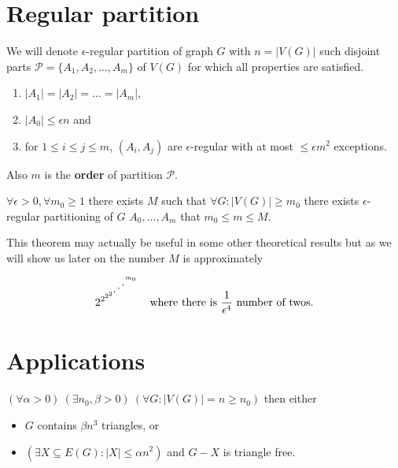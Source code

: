 \section{Regular partition}

\begin{defn}
	We will denote $\epsilon$-regular partition of graph $G$ with $n = |V(G)|$ such disjoint parts $\mathcal{P} = \{A_{1}, A_{2}, \dots, A_{m}\}$ of $V(G)$ for which all properties are satisfied.
	
	\begin{enumerate}
		\item $|A_1| = |A_2| = \dots = |A_m|$,
		\item $|A_0| \leq \epsilon n$ and
		\item for $1 \leq i \leq j \leq m$, $(A_i, A_j)$ are $\epsilon$-regular with at most $\leq \epsilon m^2$ exceptions.
	\end{enumerate}
	
	Also $m$ is the \textbf{order} of partition $\mathcal{P}$.
\end{defn}

\begin{thm}
	$\forall \epsilon > 0, \forall m_0 \geq 1$ there exists $M$ such that $\forall G : |V(G)| \geq m_0$ there exists $\epsilon$-regular partitioning of $G$ $A_0, \dots, A_m$ that $m_0 \leq m \leq M$.
\end{thm}

This theorem may actually be useful in some other theoretical results but as we will show us later on the number $M$ is approximately

$$
2^{2{^{2^{2^{\reflectbox{$\ddots$}^{m_0}}}}}} \quad \text{where there is } \frac{1}{\epsilon^4} \text{ number of twos.}
$$

\section{Applications}

\begin{lemma}
	$(\forall \alpha >0) \ (\exists n_0, \beta > 0) \ (\forall G : |V(G)| = n \geq n_0)$ then either
	
	\begin{itemize}
		\item $G$ contains $\beta n^3$ triangles, or
		\item $(\exists X \subseteq E(G): |X| \leq \alpha n^2)$ and $G-X$ is triangle free.
	\end{itemize}
\end{lemma}

